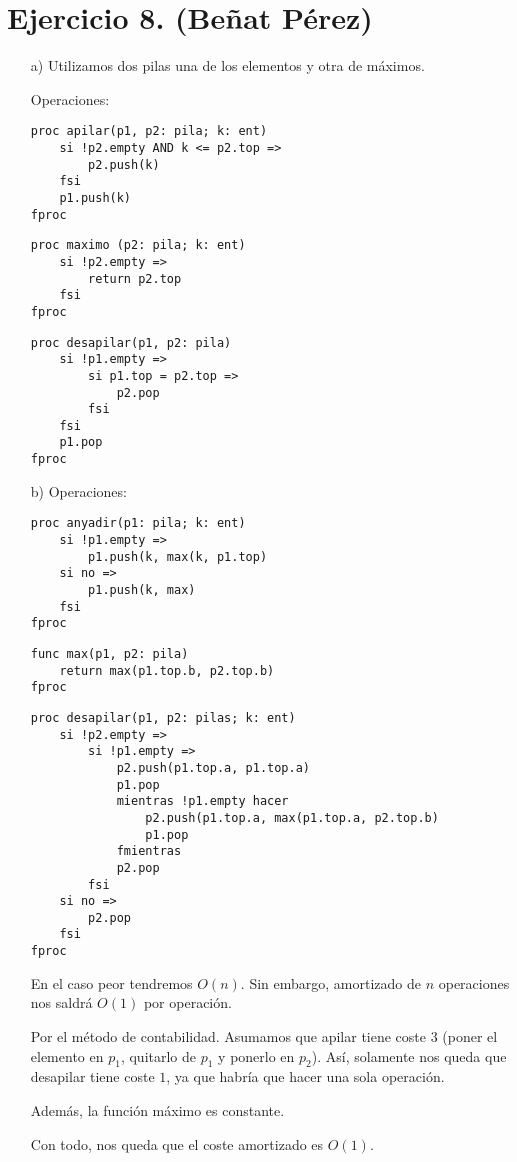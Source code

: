 \documentclass[10pt,a4paper,openright]{book}
\theoremstyle{break}
\begin{document}
\section{Ejercicio 8. (Beñat Pérez)}%
\label{sec:ejercicio_8}
\begin{enumerate}
\item[a)] Utilizamos dos pilas una de los elementos y otra de máximos.

Operaciones:
\begin{lstlisting}
proc apilar(p1, p2: pila; k: ent)
    si !p2.empty AND k <= p2.top =>
        p2.push(k)
    fsi
    p1.push(k)
fproc 
\end{lstlisting}

\begin{lstlisting}
proc maximo (p2: pila; k: ent)
    si !p2.empty => 
        return p2.top
    fsi
fproc
\end{lstlisting}

\begin{lstlisting}
proc desapilar(p1, p2: pila)
    si !p1.empty =>
        si p1.top = p2.top =>
            p2.pop
        fsi
    fsi
    p1.pop
fproc
\end{lstlisting}

\item[b)] Operaciones:

\begin{lstlisting}
proc anyadir(p1: pila; k: ent) 
    si !p1.empty =>
        p1.push(k, max(k, p1.top)
    si no =>
        p1.push(k, max)
    fsi
fproc
\end{lstlisting}

\begin{lstlisting}
func max(p1, p2: pila) 
    return max(p1.top.b, p2.top.b)
fproc
\end{lstlisting}

\begin{lstlisting}
proc desapilar(p1, p2: pilas; k: ent) 
    si !p2.empty =>
        si !p1.empty =>
            p2.push(p1.top.a, p1.top.a)
            p1.pop
            mientras !p1.empty hacer
                p2.push(p1.top.a, max(p1.top.a, p2.top.b)
                p1.pop
            fmientras
            p2.pop
        fsi
    si no =>
        p2.pop
    fsi
fproc
\end{lstlisting}
En el caso peor tendremos $O\left( n \right)$. Sin embargo, amortizado de $n$ operaciones nos saldrá $O\left( 1 \right)$ por operación.

Por el método de contabilidad. Asumamos que apilar tiene coste $3$ (poner el elemento en $p_1$, quitarlo de $p_1$ y ponerlo en $p_2$). Así, solamente nos queda que desapilar tiene coste $1$, ya que habría que hacer una sola operación. 

Además, la función máximo es constante. 

Con todo, nos queda que el coste amortizado es $O\left( 1 \right)$.
\end{enumerate}
\end{document}
